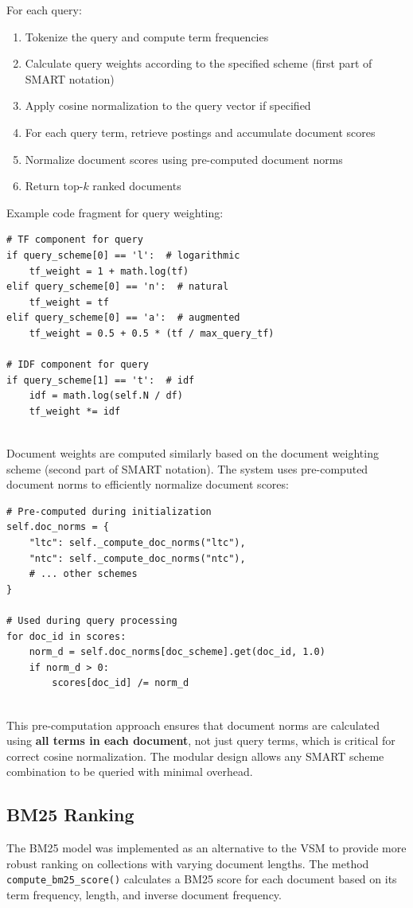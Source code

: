 \documentclass[11pt,a4paper]{article}
\begin{document}
For each query:
\begin{enumerate}
    \item Tokenize the query and compute term frequencies
    \item Calculate query weights according to the specified scheme (first part of SMART notation)
    \item Apply cosine normalization to the query vector if specified
    \item For each query term, retrieve postings and accumulate document scores
    \item Normalize document scores using pre-computed document norms
    \item Return top-$k$ ranked documents
\end{enumerate}

Example code fragment for query weighting:
\begin{verbatim}
# TF component for query
if query_scheme[0] == 'l':  # logarithmic
    tf_weight = 1 + math.log(tf)
elif query_scheme[0] == 'n':  # natural
    tf_weight = tf
elif query_scheme[0] == 'a':  # augmented
    tf_weight = 0.5 + 0.5 * (tf / max_query_tf)

# IDF component for query
if query_scheme[1] == 't':  # idf
    idf = math.log(self.N / df)
    tf_weight *= idf
\end{verbatim}
\newpage
\\
Document weights are computed similarly based on the document weighting scheme (second part 
of SMART notation). The system uses pre-computed document norms to efficiently normalize 
document scores:

\begin{verbatim}
# Pre-computed during initialization
self.doc_norms = {
    "ltc": self._compute_doc_norms("ltc"),
    "ntc": self._compute_doc_norms("ntc"),
    # ... other schemes
}

# Used during query processing
for doc_id in scores:
    norm_d = self.doc_norms[doc_scheme].get(doc_id, 1.0)
    if norm_d > 0:
        scores[doc_id] /= norm_d
\end{verbatim}
\\
This pre-computation approach ensures that document norms are calculated using \textbf{all terms 
in each document}, not just query terms, which is critical for correct cosine normalization. 
The modular design allows any SMART scheme combination to be queried with minimal overhead.

\subsection{BM25 Ranking}
\label{subsec:bm25}
The BM25 model was implemented as an alternative to the VSM to provide more robust ranking 
on collections with varying document lengths. 
The method \texttt{compute\_bm25\_score()} calculates a BM25 score for each document 
based on its term frequency, length, and inverse document frequency.
\end{document}
